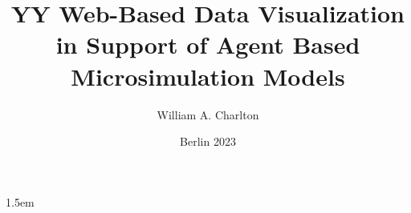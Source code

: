 \newcommand*{\Title}{YY Web-Based Data Visualization in Support of Agent Based Microsimulation Models}

\newcommand*{\Autor}{William A. Charlton}
\newcommand*{\Datum}{Berlin 2023}
\title{\Title}
\author{\Autor}
\date{\Datum}

\newcommand{\tfk}[1]{\textsl{\texttt{#1}}}
\newcommand{\fett}[1]{\textbf{#1}}
\newcommand{\kursiv}[1]{\textit{#1}}
\newcommand{\pbb}{\parbox}
\newcommand{\sst}{\scriptstyle}


\providecommand{\tightlist}{%
  \setlength{\itemsep}{0pt}\setlength{\parskip}{0pt}}

\def\umbruch{\clearpage}



\frenchspacing								%
\setlength{\parindent}{1.5ex}						%
\setlength{\parskip}{0.25ex plus0.25ex minus 0.25ex}	%



\emergencystretch 1.5em %
\hfuzz 0.3pt
\vfuzz \hfuzz
\raggedbottom
{}						%

\setlength{\headheight}{1cm} 					%
\addtolength{\footnotesep}{2pt}					%

\setcounter{secnumdepth}{3}					%
\setcounter{figure}{4}							%
\setcounter{tocdepth}{1}						%

